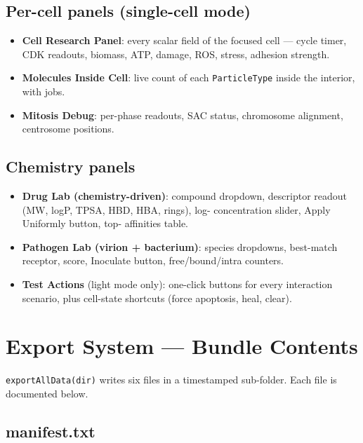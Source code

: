 \documentclass[11pt,letterpaper,twoside,openany]{book}
\newcommand{\code}[1]{\texttt{#1}}
\begin{document}
\section{Per-cell panels (single-cell mode)}

\begin{itemize}
  \item \textbf{Cell Research Panel}: every scalar field of the
        focused cell --- cycle timer, CDK readouts, biomass, ATP,
        damage, ROS, stress, adhesion strength.
  \item \textbf{Molecules Inside Cell}: live count of each
        \code{ParticleType} inside the interior, with jobs.
  \item \textbf{Mitosis Debug}: per-phase readouts, SAC status,
        chromosome alignment, centrosome positions.
\end{itemize}

\section{Chemistry panels}

\begin{itemize}
  \item \textbf{Drug Lab (chemistry-driven)}: compound dropdown,
        descriptor readout (MW, logP, TPSA, HBD, HBA, rings), log-
        concentration slider, Apply Uniformly button, top-
        affinities table.
  \item \textbf{Pathogen Lab (virion + bacterium)}: species
        dropdowns, best-match receptor, score, Inoculate button,
        free/bound/intra counters.
  \item \textbf{Test Actions} (light mode only): one-click buttons
        for every interaction scenario, plus cell-state shortcuts
        (force apoptosis, heal, clear).
\end{itemize}

\chapter{Export System --- Bundle Contents}
\label{ch:export-deep}

\code{exportAllData(dir)} writes six files in a timestamped
sub-folder. Each file is documented below.

\section{manifest.txt}
\end{document}
